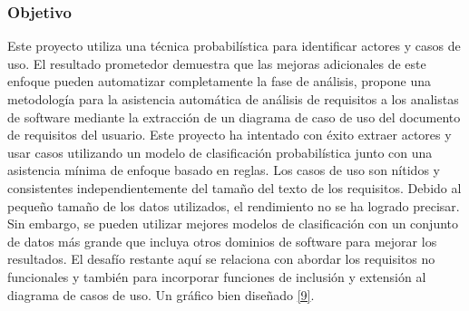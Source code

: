 \subsubsection{Objetivo}
Este proyecto utiliza una técnica probabilística para identificar actores y casos de uso. El resultado prometedor demuestra que las mejoras adicionales de este enfoque pueden automatizar completamente la fase de análisis, propone una metodología para la asistencia automática de análisis de requisitos a los analistas de software mediante la extracción de un diagrama de caso de uso del documento de requisitos del usuario.
Este proyecto ha intentado con éxito extraer actores y usar casos utilizando un modelo de clasificación probabilística junto con una asistencia mínima de enfoque basado en reglas. Los casos de uso son nítidos y consistentes independientemente del tamaño del texto de los requisitos. Debido al pequeño tamaño de los datos utilizados, el rendimiento no se ha logrado precisar. Sin embargo, se pueden utilizar mejores modelos de clasificación con un conjunto de datos más grande que incluya otros dominios de software para mejorar los resultados. El desafío restante aquí se relaciona con abordar los requisitos no funcionales y también para incorporar funciones de inclusión y extensión al diagrama de casos de uso. Un gráfico bien diseñado \hyperlink{b09}{[9]}.
